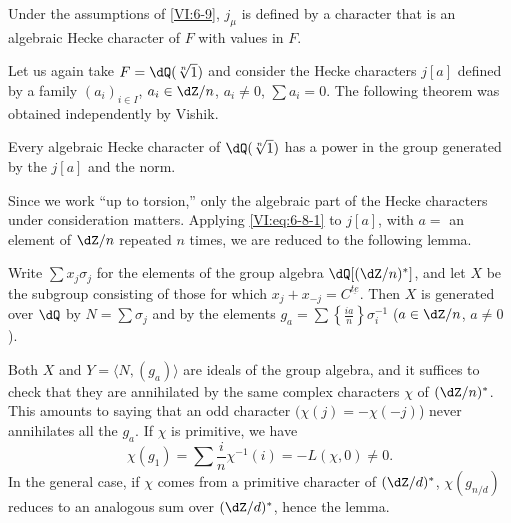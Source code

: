 \begin{proposition_}\label{VI:6-10}
Under the assumptions of \ref{VI:6-9}, $j_\mu$ is defined by a character 
that is an algebraic Hecke character of $F$ with values in $F$. 
\end{proposition_}

Let us again take $F=\dQ(\sqrt[n]{1})$ and consider the Hecke characters 
$j[a]$ defined by a family $(a_i)_{i\in I}$, $a_i\in \dZ/n$, 
$a_i\ne 0$, $\sum a_i=0$. The following theorem was obtained 
independently by Vishik. 





\begin{theorem_}\label{VI:6-11}
Every algebraic Hecke character of $\dQ(\sqrt[n]{1})$ has a power 
in the group generated by the $j[a]$ and the norm. 
\end{theorem_}

Since we work ``up to torsion,'' only the algebraic part of the 
Hecke characters under consideration matters. Applying \eqref{VI:eq:6-8-1} to 
$j[a]$, with $a=$ an element of $\dZ/n$ repeated $n$ times, we 
are reduced to the following lemma.





\begin{lemma_}\label{VI:6-12}
Write $\sum x_j \sigma_j$ for the elements of the group algebra 
  $\dQ[(\dZ/n)^\ast]$, and let $X$ be the subgroup consisting of those for which 
$x_j+x_{-j}=C^{\underline{t e}}$. Then $X$ is generated over $\dQ$ by 
$N=\sum \sigma_j$ and by the elements 
  $g_a=\sum \left\{ \frac{i a}{n}\right\} \sigma_i^{-1}$ 
($a\in \dZ/n$, $a\ne 0$). 
\end{lemma_}

Both $X$ and $Y=\langle N,(g_a)\rangle$ are ideals of the group 
algebra, and it suffices to check that they are annihilated by the same 
complex characters $\chi$ of $(\dZ/n)^\ast$. This amounts to saying that an odd character $(\chi(j)=-\chi(-j)$) never annihilates all the $g_a$. If 
$\chi$ is primitive, we have 
\[
  \chi(g_1) = \sum \frac i n \chi^{-1}(i) = -L(\chi,0)\ne 0 \text{.} 
\]
In the general case, if $\chi$ comes from a primitive character of 
  $(\dZ/d)^\ast$, $\chi(g_{n/d})$ reduces to an analogous sum over 
  $(\dZ/d)^\ast$, hence the lemma. 












